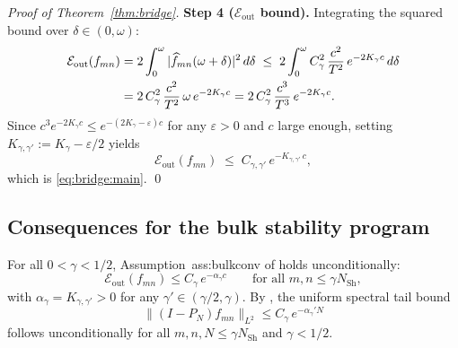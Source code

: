 \begin{proof}[Proof of Theorem~\ref{thm:bridge}]
\textbf{Step 4 ($\mathcal{E}_{\mathrm{out}}$ bound).}
Integrating the squared bound over $\delta \in (0, \omega)$:
\begin{align}
\label{eq:bridge:Eout-final}
  \mathcal{E}_{\mathrm{out}}(f_{mn})
  &= 2\int_0^\omega |\widehat{f}_{mn}(\omega+\delta)|^2\,d\delta
  \;\le\;
  2\int_0^\omega C_\gamma^2\,\frac{c^2}{T^2}\,e^{-2K_\gamma c}\,d\delta
  \notag\\
  &= 2\,C_\gamma^2\,\frac{c^2}{T^2}\,\omega\,e^{-2K_\gamma c}
  = 2\,C_\gamma^2\,\frac{c^3}{T^3}\,e^{-2K_\gamma c}.
\end{align}
Since $c^3 e^{-2K_\gamma c} \le e^{-(2K_\gamma - \varepsilon)c}$
for any $\varepsilon > 0$ and $c$ large enough, setting
$K_{\gamma,\gamma'} := K_\gamma - \varepsilon/2$ yields
\begin{equation}
  \mathcal{E}_{\mathrm{out}}(f_{mn})
  \;\le\;
  C_{\gamma,\gamma'}\,e^{-K_{\gamma,\gamma'}\,c},
\end{equation}
which is \eqref{eq:bridge:main}. \qed
\end{proof}

\subsection{Consequences for the bulk stability program}
\label{subsec:bridge-consequences}

\begin{corollary}
\label{cor:bridge:bulkconv}
For all $0 < \gamma < 1/2$, Assumption~\textup{ass:bulkconv}
of \cite{PaperIII} holds unconditionally:
\[
  \mathcal{E}_{\mathrm{out}}(f_{mn}) \le C_\gamma\,e^{-\alpha_\gamma c}
  \qquad \text{for all } m,n \le \gamma N_{\mathrm{Sh}},
\]
with $\alpha_\gamma = K_{\gamma,\gamma'} > 0$ for any
$\gamma' \in (\gamma/2,\gamma)$.
By \cite[Theorem~3.2 (thm:bulk)]{PaperIII}, the uniform
spectral tail bound
\[
  \|(I - P_N)f_{mn}\|_{L^2} \le C_\gamma\,e^{-\alpha_\gamma' N}
\]
follows unconditionally for all $m,n,N \le \gamma N_{\mathrm{Sh}}$
and $\gamma < 1/2$.
\end{corollary}

